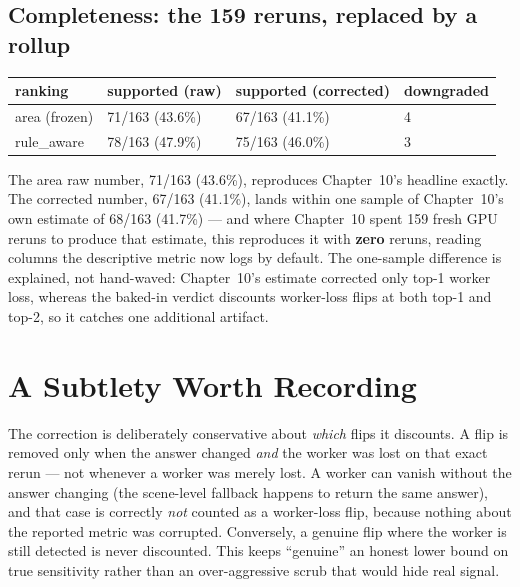\subsection{Completeness: the 159 reruns, replaced by a rollup}

\begin{center}
\begin{tabular}{p{4.4cm}p{3.2cm}p{3.2cm}p{2.4cm}}
\toprule
\textbf{ranking} & \textbf{supported (raw)} & \textbf{supported (corrected)} & \textbf{downgraded} \\
\midrule
area (frozen)  & 71/163 (43.6\%) & 67/163 (41.1\%) & 4 \\
rule\_aware    & 78/163 (47.9\%) & 75/163 (46.0\%) & 3 \\
\bottomrule
\end{tabular}
\label{tab:p14-comp}
\end{center}

The area raw number, 71/163 (43.6\%), reproduces Chapter~10's headline exactly. The corrected number,
67/163 (41.1\%), lands within one sample of Chapter~10's own estimate of 68/163 (41.7\%) --- and where
Chapter~10 spent 159 fresh GPU reruns to produce that estimate, this reproduces it with \textbf{zero}
reruns, reading columns the descriptive metric now logs by default. The one-sample difference is
explained, not hand-waved: Chapter~10's estimate corrected only top-1 worker loss, whereas the baked-in
verdict discounts worker-loss flips at both top-1 and top-2, so it catches one additional artifact.

\section{A Subtlety Worth Recording}

The correction is deliberately conservative about \emph{which} flips it discounts. A flip is removed
only when the answer changed \emph{and} the worker was lost on that exact rerun --- not whenever a
worker was merely lost. A worker can vanish without the answer changing (the scene-level fallback
happens to return the same answer), and that case is correctly \emph{not} counted as a worker-loss
flip, because nothing about the reported metric was corrupted. Conversely, a genuine flip where the
worker is still detected is never discounted. This keeps ``genuine'' an honest lower bound on true
sensitivity rather than an over-aggressive scrub that would hide real signal.

